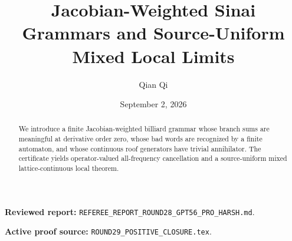 \documentclass[11pt,reqno]{amsart}
\title[A2 Round 29 revision]{Jacobian-Weighted Sinai Grammars and Source-Uniform Mixed Local Limits}
\author{Qian Qi}
\date{September 2, 2026}
\begin{document}
\begin{abstract}We introduce a finite Jacobian-weighted billiard grammar whose branch sums are meaningful at derivative order zero, whose bad words are recognized by a finite automaton, and whose continuous roof generators have trivial annihilator. The certificate yields operator-valued all-frequency cancellation and a source-uniform mixed lattice-continuous local theorem.\end{abstract}
\maketitle
\noindent\textbf{Reviewed report:} \texttt{REFEREE\_REPORT\_ROUND28\_GPT56\_PRO\_HARSH.md}.\par
\noindent\textbf{Active proof source:} \texttt{ROUND29\_POSITIVE\_CLOSURE.tex}.\par

\end{document}
